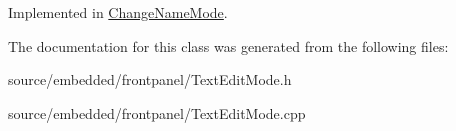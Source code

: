 Implemented in \hyperlink{class_change_name_mode_a35cea861e38fde69de934d9ac8feed40}{Change\-Name\-Mode}.



The documentation for this class was generated from the following files\-:\begin{DoxyCompactItemize}
\item 
source/embedded/frontpanel/Text\-Edit\-Mode.\-h\item 
source/embedded/frontpanel/Text\-Edit\-Mode.\-cpp\end{DoxyCompactItemize}
